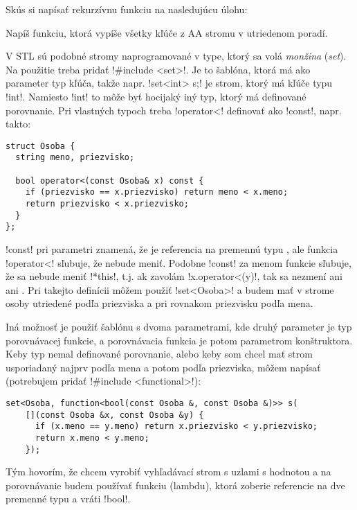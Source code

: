 Skús si napísať rekurzívnu funkciu na nasledujúcu úlohu:

\begin{uloha}
  Napíš funkciu, ktorá vypíše všetky kľúče z AA stromu v utriedenom poradí.
\end{uloha}



V STL sú podobné stromy naprogramované v type, ktorý sa volá {\em monžina} ({\em set}). 
Na použitie treba pridať \prg!#include <set>!.
Je to šablóna, ktorá má ako parameter typ kľúča, takže napr. \prg!set<int> s;! je
strom, ktorý má 
kľúče typu \prg!int!. Namiesto \prg!int! to môže byť hocijaký iný typ, ktorý má definované
porovnanie. Pri vlastných typoch treba \prg!operator<! definovať ako \prg!const!,
napr. takto:

\begin{lstlisting}
struct Osoba {
  string meno, priezvisko;

  bool operator<(const Osoba& x) const {
    if (priezvisko == x.priezvisko) return meno < x.meno;
    return priezvisko < x.priezvisko;
  }
};
\end{lstlisting}

\prg!const! pri parametri  
znamená, že  je referencia na premennú typu ,
ale funkcia \prg!operator<! sľubuje, že  nebude meniť. Podobne \prg!const! za menom
funkcie sľubuje, že sa nebude meniť \prg!*this!, t.j. ak zavolám \prg!x.operator<(y)!,
tak sa nezmení ani  ani . 
Pri takejto definícii môžem použiť \prg!set<Osoba>! a budem mať v strome osoby utriedené podľa
priezviska a pri rovnakom priezvisku podľa mena.


Iná možnosť je použiť šablónu 
s dvoma parametrami, kde druhý parameter je typ porovnávacej
funkcie, a porovnávacia funkcia je potom parametrom konštruktora. 
Keby typ  nemal definované porovnanie, alebo keby som chcel
mať strom usporiadaný najprv podľa mena a potom podľa priezviska, môžem napísať
(potrebujem pridať \prg!#include <functional>!):

\begin{lstlisting}
set<Osoba, function<bool(const Osoba &, const Osoba &)>> s(
    [](const Osoba &x, const Osoba &y) {
      if (x.meno == y.meno) return x.priezvisko < y.priezvisko;
      return x.meno < y.meno;
    });
\end{lstlisting}

Tým hovorím, že chcem vyrobiť vyhľadávací strom s uzlami s hodnotou  a na 
porovnávanie budem používať funkciu (lambdu), ktorá zoberie referencie na dve premenné
typu  a vráti \prg!bool!.


